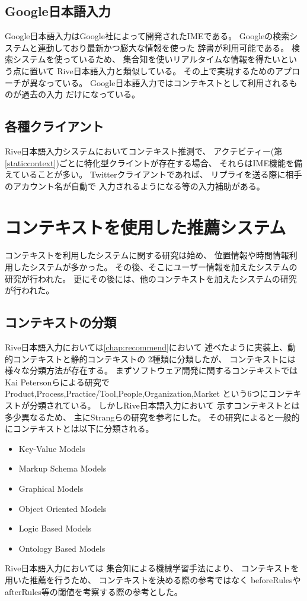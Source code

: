 \subsection{Google日本語入力}
Google日本語入力はGoogle社によって開発されたIMEである。
Googleの検索システムと連動しており最新かつ膨大な情報を使った
辞書が利用可能である。
検索システムを使っているため、
集合知を使いリアルタイムな情報を得たいという点に置いて
Rive日本語入力と類似している。
その上で実現するためのアプローチが異なっている。
Google日本語入力ではコンテキストとして利用されるものが過去の入力
だけになっている。

\subsection{各種クライアント}
Rive日本語入力システムにおいてコンテキスト推測で、
アクテビティー(第\ref{staticcontext})ごとに特化型クライントが存在する場合、
それらはIME機能を備えていることが多い。
Twitterクライアントであれば、
リプライを送る際に相手のアカウント名が自動で
入力されるようになる等の入力補助がある。

\section{コンテキストを使用した推薦システム}
コンテキストを利用したシステムに関する研究は始め、
位置情報や時間情報利用したシステムが多かった。
その後、そこにユーザー情報を加えたシステムの研究が行われた。
更にその後には、他のコンテキストを加えたシステムの研究が行われた。
\cite{okukenta}

\subsection{コンテキストの分類}
Rive日本語入力においては\ref{chap:recommend}において
述べたように実装上、動的コンテキストと静的コンテキストの
2種類に分類したが、
コンテキストには様々な分類方法が存在する。
まずソフトウェア開発に関するコンテキストでは
Kai Petersonらによる研究で\cite{KAIPETERSON}
Product,Process,Practice/Tool,People,Organization,Market
という6つにコンテキストが分類されている。
しかしRive日本語入力において
示すコンテキストとは多少異なるため、
主にStrangらの研究\cite{contextsurvey}を参考にした。
その研究によると一般的にコンテキストとは以下に分類される。
\begin{itemize}
  \item Key-Value Models
  \item Markup Schema Models
  \item Graphical Models
  \item Object Oriented Models
  \item Logic Based Models
  \item Ontology Based Models
\end{itemize}
Rive日本語入力においては
集合知による機械学習手法により、
コンテキストを用いた推薦を行うため、
コンテキストを決める際の参考ではなく
beforeRulesやafterRules等の閾値を考察する際の参考とした。

